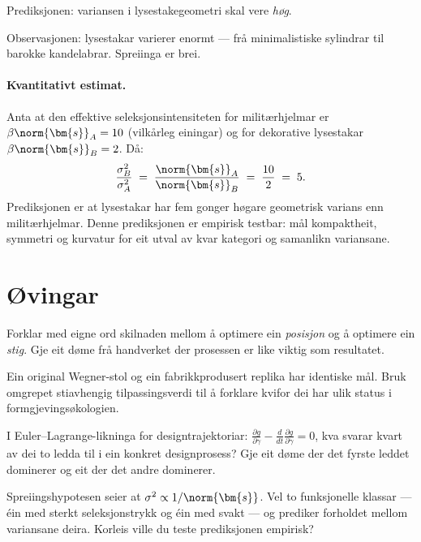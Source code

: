 \medskip
Prediksjonen: variansen i lysestakegeometri skal vere
\emph{høg}.

\medskip
Observasjonen: lysestakar varierer enormt --- frå minimalistiske
sylindrar til barokke kandelabrar. Spreiinga er brei.

\paragraph{Kvantitativt estimat.}
Anta at den effektive seleksjonsintensiteten for militærhjelmar er
$\beta \norm{\bm{s}}_A = 10$ (vilkårleg einingar) og for
dekorative lysestakar $\beta \norm{\bm{s}}_B = 2$. Då:
\[
  \frac{\sigma^2_B}{\sigma^2_A}
  \;=\; \frac{\norm{\bm{s}}_A}{\norm{\bm{s}}_B}
  \;=\; \frac{10}{2} \;=\; 5.
\]
Prediksjonen er at lysestakar har fem gonger høgare geometrisk
varians enn militærhjelmar. Denne prediksjonen er empirisk
testbar: mål kompaktheit, symmetri og kurvatur for eit utval
av kvar kategori og samanlikn variansane.


\section{Øvingar}

\begin{exercise}[Nivå 1]\label{ex:7.1}
Forklar med eigne ord skilnaden mellom å optimere ein
\emph{posisjon} og å optimere ein \emph{stig}. Gje eit døme frå
handverket der prosessen er like viktig som resultatet.
\end{exercise}

\begin{exercise}[Nivå 1]\label{ex:7.2}
Ein original Wegner-stol og ein fabrikkprodusert replika har
identiske mål. Bruk omgrepet stiavhengig tilpassingsverdi til å
forklare kvifor dei har ulik status i formgjevingsøkologien.
\end{exercise}

\begin{exercise}[Nivå 2]\label{ex:7.3}
I Euler--Lagrange-likninga for designtrajektoriar:
$\frac{\partial g}{\partial \gamma}
- \frac{d}{dt}\frac{\partial g}{\partial \dot{\gamma}} = 0$,
kva svarar kvart av dei to ledda til i ein konkret designprosess?
Gje eit døme der det fyrste leddet dominerer og eit der det andre
dominerer.
\end{exercise}

\begin{exercise}[Nivå 2]\label{ex:7.4}
Spreiingshypotesen seier at $\sigma^2 \propto 1/\norm{\bm{s}}$.
Vel to funksjonelle klassar --- éin med sterkt seleksjonstrykk og
éin med svakt --- og prediker forholdet mellom variansane deira.
Korleis ville du teste prediksjonen empirisk?
\end{exercise}

